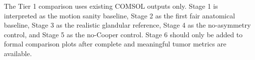 The Tier 1 comparison uses existing COMSOL outputs only. Stage 1 is interpreted as the motion sanity baseline, Stage 2 as the first fair anatomical baseline, Stage 3 as the realistic glandular reference, Stage 4 as the no-asymmetry control, and Stage 5 as the no-Cooper control. Stage 6 should only be added to formal comparison plots after complete and meaningful tumor metrics are available.
